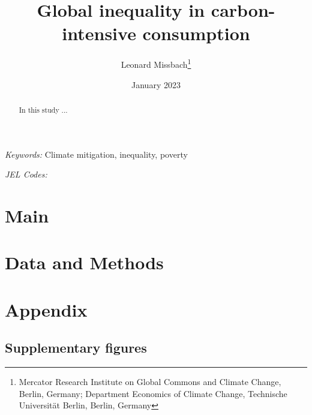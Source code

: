 \documentclass[12pt, a4paper]{article}
\title{Global inequality in carbon-intensive consumption}
\author{Leonard Missbach\thanks{Mercator Research Institute on Global Commons and Climate Change, Berlin, Germany; Department Economics of Climate Change, Technische Universität Berlin, Berlin, Germany}}
\date{January 2023}
\begin{document}
\maketitle
\begin{abstract}
  In this study ...
\end{abstract}

\smallskip

\noindent \small \textit{Keywords:} Climate mitigation, inequality, poverty

\noindent \small \textit{JEL Codes:}

\thispagestyle{empty}
\clearpage
\setcounter{page}{1}

\section{Main} \label{sec:main}

\clearpage

\section{Data and Methods} \label{sec:data_and_methods}

\clearpage

\printbibliography

\clearpage

\appendix

\section{Appendix} \label{sec:appendix}

\renewcommand\thefigure{\thesection.\arabic{figure}}
\renewcommand\thetable{\thesection.\arabic{table}}
\setcounter{figure}{0}
\setcounter{table}{0}

\subsection{Supplementary figures} \label{sec:figures}
\end{document}
